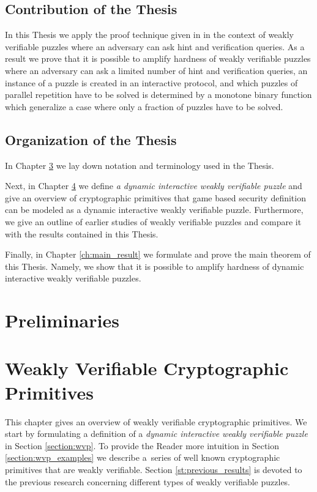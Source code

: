 \documentclass[11pt,a4paper,titlepage]{memoir}
\begin{document}
\section{Contribution of the Thesis}
In this Thesis we apply the proof technique given in \cite{DBLP:journals/corr/abs-1002-3534}
in the context of weakly verifiable puzzles where an adversary can ask hint and verification queries.
As a result we prove that it is possible to amplify hardness of weakly verifiable puzzles where an adversary
can ask a limited number of hint and verification queries, an instance of a puzzle is created in an interactive protocol,
and which puzzles of parallel repetition have to be solved is determined by a monotone binary function which generalize
a case where only a fraction of puzzles have to be solved.

\section{Organization of the Thesis}
In Chapter \ref{ch:preliminaries} we lay down notation and terminology used in the Thesis.

Next, in Chapter \ref{ch:intro_weakly} we define \textit{a dynamic interactive weakly verifiable puzzle} and
give an overview of cryptographic primitives that game based security definition can be modeled as
a dynamic interactive weakly verifiable puzzle. Furthermore, we give an outline of earlier studies
of weakly verifiable puzzles and compare it with the results contained in this Thesis.

Finally, in Chapter \ref{ch:main_result} we formulate and prove the main theorem of this Thesis.
Namely, we show that it is possible to amplify hardness of dynamic interactive weakly verifiable puzzles.
%
\chapter{Preliminaries}
\label{ch:preliminaries}


\chapter{Weakly Verifiable Cryptographic Primitives}
\label{ch:intro_weakly}
This chapter gives an overview of weakly verifiable cryptographic primitives.
We start by formulating a definition of a \textit{dynamic interactive weakly verifiable puzzle} in Section \ref{section:wvp}.
To provide the Reader more intuition in Section \ref{section:wvp_examples} we describe a~series of well known cryptographic primitives
that are weakly verifiable. Section \ref{st:previous_results} is devoted to the previous research concerning different types of weakly verifiable puzzles.
%



%
\end{document}
